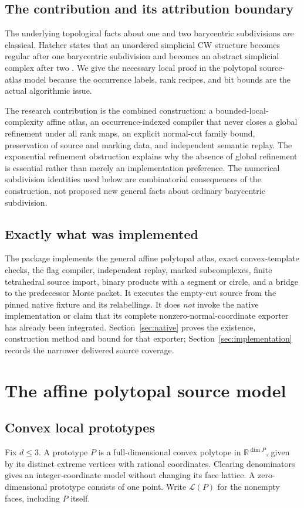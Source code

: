 \documentclass[11pt]{article}
\theoremstyle{definition}\newtheorem{definition}[theorem]{Definition}
\theoremstyle{remark}\newtheorem{remark}[theorem]{Remark}
\newcommand{\code}[1]{\texttt{\detokenize{#1}}}
\newcommand{\faceposet}{\mathcal L}
\begin{document}
\subsection{The contribution and its attribution boundary}
The underlying topological facts about one and two barycentric subdivisions are classical. Hatcher states that an unordered simplicial CW structure becomes regular after one barycentric subdivision and becomes an abstract simplicial complex after two \cite{hatcher}. We give the necessary local proof in the polytopal source-atlas model because the occurrence labels, rank recipes, and bit bounds are the actual algorithmic issue.

The research contribution is the combined construction: a bounded-local-complexity affine atlas, an occurrence-indexed compiler that never closes a global refinement under all rank maps, an explicit normal-cut family bound, preservation of source and marking data, and independent semantic replay. The exponential refinement obstruction explains why the absence of global refinement is essential rather than merely an implementation preference. The numerical subdivision identities used below are combinatorial consequences of the construction, not proposed new general facts about ordinary barycentric subdivision.

\subsection{Exactly what was implemented}
The package implements the general affine polytopal atlas, exact convex-template checks, the flag compiler, independent replay, marked subcomplexes, finite tetrahedral source import, binary products with a segment or circle, and a bridge to the predecessor Morse packet. It executes the empty-cut source from the pinned native fixture and its relabellings. It does \emph{not} invoke the native \code{normal_cut_cell_complex} implementation or claim that its complete nonzero-normal-coordinate exporter has already been integrated. Section~\ref{sec:native} proves the existence, construction method and bound for that exporter; Section~\ref{sec:implementation} records the narrower delivered source coverage.

\section{The affine polytopal source model}
\label{sec:model}

\subsection{Convex local prototypes}
Fix \(d\leq 3\). A prototype \(P\) is a full-dimensional convex polytope in \(\mathbb R^{\dim P}\), given by its distinct extreme vertices with rational coordinates. Clearing denominators gives an integer-coordinate model without changing its face lattice. A zero-dimensional prototype consists of one point. Write \(\faceposet(P)\) for the nonempty faces, including \(P\) itself.
\end{document}
